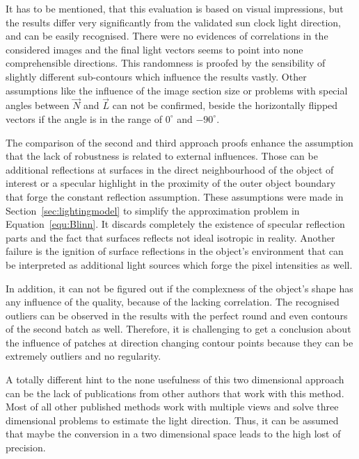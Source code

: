 It has to be mentioned, that this evaluation is based on visual impressions, but the results differ very significantly from the validated sun clock light direction, and can be easily recognised. There were no evidences of correlations in the considered images and the final light vectors seems to point into none comprehensible directions. This randomness is proofed by the sensibility of slightly different sub-contours which influence the results vastly. Other assumptions like the influence of the image section size or problems with special angles between $\vec{N}$ and $\vec{L}$ can not be confirmed, beside the horizontally flipped vectors if the angle is in the range of  $0^\circ $ and $-90^\circ$. 

The comparison of the second and third approach proofs enhance the assumption that the lack of robustness is related to external influences. Those can be additional reflections at surfaces in the direct neighbourhood of the object of interest or a specular highlight in the proximity of the outer object boundary that forge the constant reflection assumption. These assumptions were made in Section~\ref{sec:lightingmodel} to simplify the approximation problem in Equation~\ref{equ:Blinn}. It discards completely the existence of specular reflection parts and the fact that surfaces reflects not ideal isotropic in reality. Another failure is the ignition of surface reflections in the object's environment that can be interpreted as additional light sources which forge the pixel intensities as well. 

In addition, it can not be figured out if the complexness of the object's shape has any influence of the quality, because of the lacking correlation. The recognised outliers can be observed in the results with the perfect round and even contours of the second batch as well. Therefore, it is challenging to get a conclusion about the influence of patches at direction changing contour points because they can be extremely outliers and no regularity.

A totally different hint to the none usefulness of this two dimensional approach can be the lack of publications from other authors that work with this method. Most of all other published methods work with multiple views and solve three dimensional problems to estimate the light direction. Thus, it can be assumed that maybe the conversion in a two dimensional space leads to the high lost of precision.

